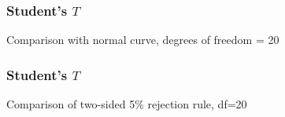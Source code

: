 \documentclass[handout]{beamer}
\begin{document}
   \begin{frame}
   \frametitle{Student's $T$}
   \begin{center}
   \end{center}
   Comparison with normal curve, degrees of freedom = 20
   \end{frame}



   \begin{frame}
   \frametitle{Student's $T$}
   \begin{center}
   \end{center}
   Comparison of two-sided {\color{blue} 5\% rejection rule}, df=20
   \end{frame}


   \begin{frame} 

   \end{frame}

   
\end{document}
